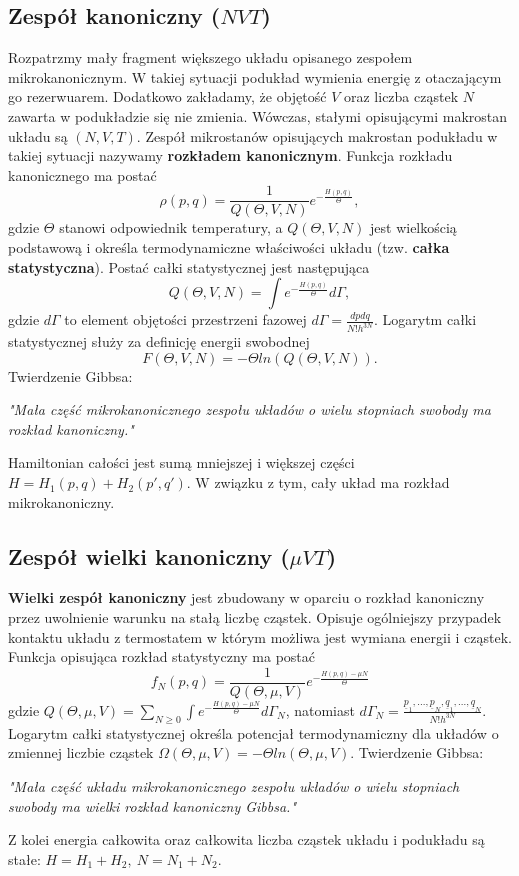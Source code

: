 \documentclass[12pt,a4paper,openright]{report} %
\begin{document}
\subsection{Zespół kanoniczny ($N V T$)}
Rozpatrzmy mały fragment większego układu opisanego zespołem mikrokanonicznym. W takiej sytuacji podukład wymienia energię z otaczającym go rezerwuarem. Dodatkowo zakładamy, że objętość $V$ oraz liczba cząstek $N$ zawarta w podukładzie się nie zmienia. Wówczas, stałymi opisującymi makrostan układu są $(N, V, T)$. Zespół mikrostanów opisujących makrostan podukładu w takiej sytuacji nazywamy \textbf{rozkładem kanonicznym}. Funkcja rozkładu kanonicznego ma postać
\begin{equation}
\rho(p,q)=\frac{1}{Q(\Theta, V, N)}e^{-\frac{H(p,q)}{\Theta}},
\end{equation}  
gdzie $\Theta$ stanowi odpowiednik temperatury, a $Q(\Theta, V, N)$ jest wielkością podstawową i określa termodynamiczne właściwości układu (tzw. \textbf{całka statystyczna}). Postać całki statystycznej jest następująca
\begin{equation}
Q(\Theta, V, N)= \int e^{-\frac{H(p,q)}{\Theta}} d \Gamma,
\end{equation}
gdzie $d \Gamma$ to element objętości przestrzeni fazowej $d \Gamma=\frac{dpdq}{N! h^{3N}}$. Logarytm całki statystycznej służy za definicję energii swobodnej
\begin{equation}
F(\Theta,V,N)=-\Theta ln(Q(\Theta, V, N)).
\end{equation}
Twierdzenie Gibbsa:
\begin{center}
\textit{"Mała część mikrokanonicznego zespołu układów o wielu stopniach swobody ma rozkład kanoniczny."}
\end{center}
Hamiltonian całości jest sumą mniejszej i większej części $H=H_1(p,q)+H_2(p', q')$. W związku z tym, cały układ ma rozkład mikrokanoniczny.
\subsection{Zespół wielki kanoniczny ($\mu V T$)}
\textbf{Wielki zespół kanoniczny} jest zbudowany w oparciu o rozkład kanoniczny przez uwolnienie warunku na stałą liczbę cząstek. Opisuje ogólniejszy przypadek kontaktu układu z termostatem w którym możliwa jest wymiana energii i cząstek. Funkcja opisująca rozkład statystyczny ma postać
\begin{equation}
f_N(p,q)=\frac{1}{Q(\Theta,\mu,V)}e^{-\frac{H(p,q)-\mu N}{\Theta}}
\end{equation}
gdzie $Q(\Theta,\mu,V)=\sum\limits_{N \geq 0} \int e^{-\frac{H(p,q)-\mu N}{\Theta}} d \Gamma_N $, natomiast $d \Gamma_N = \frac{\underline{p}_1,...,\underline{p}_N, \underline{q}_1,...,\underline{q}_N}{N!h^{3N}}$. Logarytm całki statystycznej określa potencjał termodynamiczny dla układów o zmiennej liczbie cząstek $\Omega (\Theta, \mu, V) = -\Theta ln(\Theta, \mu, V)$.
Twierdzenie Gibbsa:
\begin{center}
\textit{"Mała część układu mikrokanonicznego zespołu układów o wielu stopniach swobody ma wielki rozkład kanoniczny Gibbsa."}
\end{center} 
Z kolei energia całkowita oraz całkowita liczba cząstek układu i podukładu są stałe: $H=H_1 + H_2, ~ N=N_1+N_2$.
\end{document}
